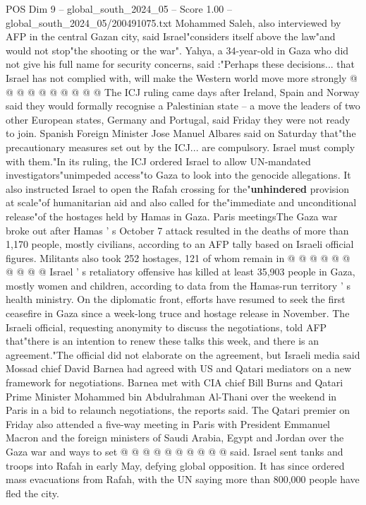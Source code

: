 \begin{textsample}{POS Dim 9 – global\_south\_2024\_05 – Score 1.00 – global\_south\_2024\_05/200491075.txt}
Mohammed Saleh, also interviewed by AFP in the central Gazan city, said Israel"considers itself above the law"and would not stop"the shooting or the war".
Yahya, a 34-year-old in Gaza who did not give his full name for security concerns, said :"Perhaps these decisions... that Israel has not complied with, will make the Western world move more strongly @ @ @ @ @ @ @ @ @ @ The ICJ ruling came days after Ireland, Spain and Norway said they would formally recognise a Palestinian state -- a move the leaders of two other European states, Germany and Portugal, said Friday they were not ready to join.
Spanish Foreign Minister Jose Manuel Albares said on Saturday that"the precautionary measures set out by the ICJ... are compulsory.
Israel must comply with them."In its ruling, the ICJ ordered Israel to allow UN-mandated investigators"unimpeded access"to Gaza to look into the genocide allegations.
It also instructed Israel to open the Rafah crossing for the"\textbf{unhindered} provision at scale"of humanitarian aid and also called for the"immediate and unconditional release"of the hostages held by Hamas in Gaza.
Paris meetingsThe Gaza war broke out after Hamas ' s October 7 attack resulted in the deaths of more than 1,170 people, mostly civilians, according to an AFP tally based on Israeli official figures.
Militants also took 252 hostages, 121 of whom remain in @ @ @ @ @ @ @ @ @ @ Israel ' s retaliatory offensive has killed at least 35,903 people in Gaza, mostly women and children, according to data from the Hamas-run territory ' s health ministry.
On the diplomatic front, efforts have resumed to seek the first ceasefire in Gaza since a week-long truce and hostage release in November.
The Israeli official, requesting anonymity to discuss the negotiations, told AFP that"there is an intention to renew these talks this week, and there is an agreement."The official did not elaborate on the agreement, but Israeli media said Mossad chief David Barnea had agreed with US and Qatari mediators on a new framework for negotiations.
Barnea met with CIA chief Bill Burns and Qatari Prime Minister Mohammed bin Abdulrahman Al-Thani over the weekend in Paris in a bid to relaunch negotiations, the reports said.
The Qatari premier on Friday also attended a five-way meeting in Paris with President Emmanuel Macron and the foreign ministers of Saudi Arabia, Egypt and Jordan over the Gaza war and ways to set @ @ @ @ @ @ @ @ @ @ said.
Israel sent tanks and troops into Rafah in early May, defying global opposition.
It has since ordered mass evacuations from Rafah, with the UN saying more than 800,000 people have fled the city.

\end{textsample}
